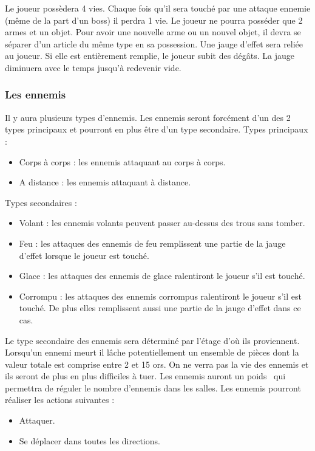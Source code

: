 \documentclass[]{extarticle}
\begin{document}
Le joueur possèdera 4 vies. Chaque fois qu’il sera touché par une attaque ennemie (même de la part d’un boss) il perdra 1 vie.
\bigbreak
Le joueur ne pourra posséder que 2 armes et un objet. Pour avoir une nouvelle arme ou un nouvel objet, il devra se séparer d’un article du même type en sa possession.
 \bigbreak
Une jauge d’effet sera reliée au joueur. Si elle est entièrement remplie, le joueur subit des dégâts. La jauge diminuera avec le temps jusqu’à redevenir vide.
\bigbreak

		\subsubsection{Les ennemis}
\bigbreak
\bigbreak
Il y aura plusieurs types d’ennemis. Les ennemis seront forcément d’un des 2 types principaux et pourront en plus être d’un type secondaire.
\bigbreak
Types principaux :
\begin{itemize}
\item Corps à corps : les ennemis attaquant au corps à corps.
\item A distance : les ennemis attaquant à distance.
\end{itemize}
\bigbreak
Types secondaires :
\begin{itemize}
\item Volant : les ennemis volants peuvent passer au-dessus des trous sans tomber.
\item Feu : les attaques des ennemis de feu remplissent une partie de la jauge d’effet lorsque le joueur est touché.
\item Glace : les attaques des ennemis de glace ralentiront le joueur s’il est touché.
\item Corrompu : les attaques des ennemis corrompus ralentiront le joueur s’il est touché. De plus elles remplissent aussi une partie de la jauge d’effet dans ce cas.
\end{itemize}
\bigbreak 
Le type secondaire des ennemis sera déterminé par l’étage d’où ils proviennent.
\bigbreak
Lorsqu’un ennemi meurt il lâche potentiellement un ensemble de pièces dont la valeur totale est comprise entre 2 et 15 ors.
\bigbreak
On ne verra pas la vie des ennemis et ils seront de plus en plus difficiles à tuer. 
\bigbreak
Les ennemis auront un \og poids \fg \, qui permettra de réguler le nombre d’ennemis dans les salles.
\bigbreak
Les ennemis pourront réaliser les actions suivantes :
\begin{itemize}
\item Attaquer.
\item Se déplacer dans toutes les directions.
\end{itemize}
\bigbreak
\end{document}
